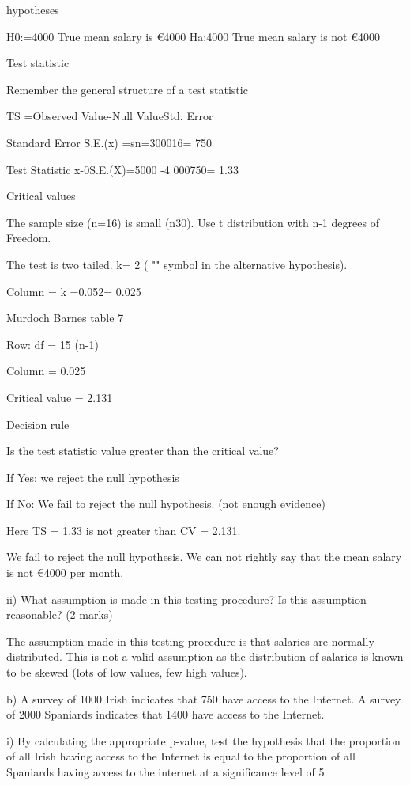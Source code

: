 \documentclass[12pt]{report}
\begin{document}
hypotheses

H0:=4000    True mean salary is €4000
Ha:4000    True mean salary is  not €4000

Test statistic

Remember the general structure of a test statistic

TS =Observed Value-Null ValueStd. Error 



Standard Error		S.E.(x) =sn=300016= 750

Test Statistic		x-0S.E.(X)=5000 -4 000750= 1.33


Critical values

The sample size (n=16) is small (n30). Use t distribution with n-1 degrees of Freedom.


The test is two tailed.  k= 2  ( "" symbol in the alternative hypothesis).


Column = k =0.052= 0.025


Murdoch Barnes table 7


Row: df = 15         (n-1)

Column = 0.025

Critical value =  2.131 


Decision rule


Is the test statistic value greater than the critical value?

If Yes: we reject the null hypothesis

If No: We fail to reject the null hypothesis. (not enough evidence)


Here TS = 1.33  is not greater than CV = 2.131.


We fail to reject the null hypothesis. We can not rightly say that the mean salary is not €4000 per month.


ii)      What assumption is made in this testing procedure? Is this assumption reasonable?  (2 marks)

The assumption made in this testing procedure is that salaries are normally distributed.
This is not a valid assumption as the distribution of salaries is known to be skewed (lots of low values, few high values).







b) A survey of 1000 Irish indicates that 750 have access to the Internet. A survey of 2000 Spaniards indicates that 1400 have access to the Internet.

i)        By calculating the appropriate p-value, test the hypothesis that the proportion of all Irish having access to the Internet
is equal to the proportion of all Spaniards having access to the internet at a significance level of 5%
\end{document}
